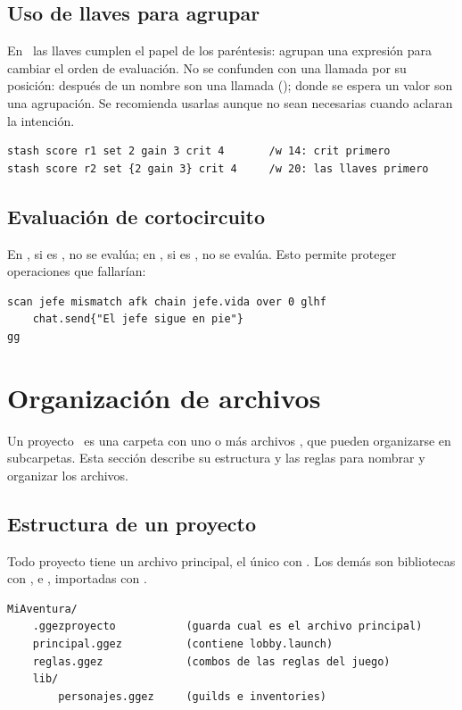 \subsection{Uso de llaves para agrupar}

En \ggez\ las llaves \kw{\{ \}} cumplen el papel de los paréntesis: agrupan una expresión para cambiar el orden de evaluación. No se confunden con una llamada por su posición: después de un nombre son una llamada (); donde se espera un valor son una agrupación. Se recomienda usarlas aunque no sean necesarias cuando aclaran la intención.
\begin{lstlisting}
stash score r1 set 2 gain 3 crit 4       /w 14: crit primero
stash score r2 set {2 gain 3} crit 4     /w 20: las llaves primero
\end{lstlisting}

\subsection{Evaluación de cortocircuito}

En , si  es ,  no se evalúa; en , si  es ,  no se evalúa. Esto permite proteger operaciones que fallarían:
\begin{lstlisting}
scan jefe mismatch afk chain jefe.vida over 0 glhf
    chat.send{"El jefe sigue en pie"}
gg
\end{lstlisting}

\newpage
\section{Organización de archivos}

Un proyecto \ggez\ es una carpeta con uno o más archivos , que pueden organizarse en subcarpetas. Esta sección describe su estructura y las reglas para nombrar y organizar los archivos.

\subsection{Estructura de un proyecto}

Todo proyecto tiene un archivo principal, el único con . Los demás son bibliotecas con ,  e , importadas con .

\begin{lstlisting}[language={}]
MiAventura/
    .ggezproyecto           (guarda cual es el archivo principal)
    principal.ggez          (contiene lobby.launch)
    reglas.ggez             (combos de las reglas del juego)
    lib/
        personajes.ggez     (guilds e inventories)
\end{lstlisting}

